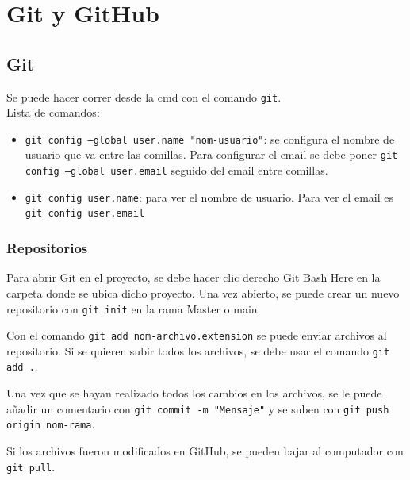 \documentclass[a4paper, 12pt]{book}
\begin{document}
%
\chapter{Git y GitHub}
\section{Git}
Se puede hacer correr desde la cmd con el comando \texttt{git}. \\
Lista de comandos:
\begin{itemize}
\item \texttt{git config --global user.name "nom-usuario"}: se configura el nombre de usuario que va entre las comillas. Para configurar el email se debe poner \texttt{git config --global user.email} seguido del email entre comillas.
\item \texttt{git config user.name}: para ver el nombre de usuario. Para ver el email es \texttt{git config user.email}
\end{itemize}
\subsection{Repositorios}
Para abrir Git en el proyecto, se debe hacer clic derecho Git Bash Here en la carpeta donde se ubica dicho proyecto. Una vez abierto, se puede crear un nuevo repositorio con \texttt{git init} en la rama Master o main.

Con el comando \texttt{git add nom-archivo.extension} se puede enviar archivos al repositorio. Si se quieren subir todos los archivos, se debe usar el comando \texttt{git add .}.

Una vez que se hayan realizado todos los cambios en los archivos, se le puede añadir un comentario con \texttt{git commit -m "Mensaje"} y se suben con \texttt{git push origin nom-rama}.

Si los archivos fueron modificados en GitHub, se pueden bajar al computador con \texttt{git pull}.
\end{document}
